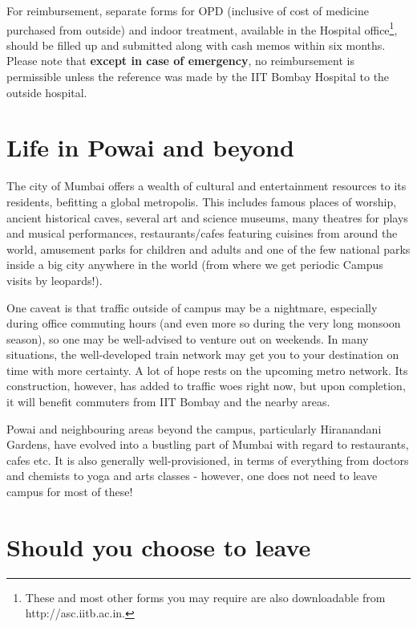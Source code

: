 \documentclass[
  10pt,
  a5paper,
  10pt,
  openany]{amsbook}
\begin{document}
For reimbursement, separate forms for OPD (inclusive of cost of medicine
purchased from outside) and indoor treatment, available in the Hospital
office\footnote{These and most other forms you may require are also
  downloadable from http://asc.iitb.ac.in.}, should be filled up and
submitted along with cash memos within six months. Please note that
\textbf{except in case of emergency}, no reimbursement is permissible
unless the reference was made by the IIT Bombay Hospital to the outside
hospital.

\chapter{Life in Powai and beyond}\label{life-in-powai-and-beyond}

The city of Mumbai offers a wealth of cultural and entertainment
resources to its residents, befitting a global metropolis. This includes
famous places of worship, ancient historical caves, several art and
science museums, many theatres for plays and musical performances,
restaurants/cafes featuring cuisines from around the world, amusement
parks for children and adults and one of the few national parks inside a
big city anywhere in the world (from where we get periodic Campus visits
by leopards!).

One caveat is that traffic outside of campus may be a nightmare,
especially during office commuting hours (and even more so during the
very long monsoon season), so one may be well-advised to venture out on
weekends. In many situations, the well-developed train network may get
you to your destination on time with more certainty. A lot of hope rests
on the upcoming metro network. Its construction, however, has added to
traffic woes right now, but upon completion, it will benefit commuters
from IIT Bombay and the nearby areas.

Powai and neighbouring areas beyond the campus, particularly Hiranandani
Gardens, have evolved into a bustling part of Mumbai with regard to
restaurants, cafes etc. It is also generally well-provisioned, in terms
of everything from doctors and chemists to yoga and arts classes -
however, one does not need to leave campus for most of these!

\chapter{Should you choose to leave}\label{should-you-choose-to-leave}
\end{document}

